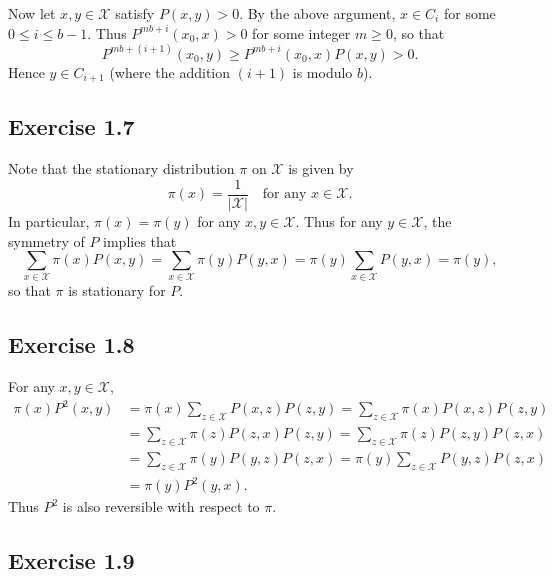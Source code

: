 \documentclass[12pt]{article}
\begin{document}
Now let $x, y \in \mathcal{X}$ satisfy $P(x, y) > 0$. By the above argument, $x \in C_i$ for some $0 \leq i \leq b - 1$. Thus $P^{mb+i}(x_0, x) > 0$ for some integer $m \geq 0$, so that
\begin{equation*}
P^{mb+(i+1)}(x_0, y) \geq P^{mb+i}(x_0, x) P(x, y) > 0.
\end{equation*}
Hence $y \in C_{i+1}$ (where the addition $(i+1)$ is modulo $b$).

\subsection*{Exercise 1.7}

Note that the stationary distribution $\pi$ on $\mathcal{X}$ is given by
\begin{equation*}
\pi(x) = \frac{1}{|\mathcal{X}|} \quad \text{for any $x \in \mathcal{X}$}.
\end{equation*}
In particular, $\pi(x) = \pi(y)$ for any $x, y \in \mathcal{X}$. Thus for any $y \in \mathcal{X}$, the symmetry of $P$ implies that
\begin{equation*}
\sum_{x \in \mathcal{X}} \pi(x) P(x, y) = \sum_{x \in \mathcal{X}} \pi(y) P(y, x) = \pi(y) \sum_{x \in \mathcal{X}} P(y, x) = \pi(y),
\end{equation*}
so that $\pi$ is stationary for $P$.

\subsection*{Exercise 1.8}

For any $x, y \in \mathcal{X}$,
\begin{align*}
\pi(x) P^2(x, y) &= \pi(x) \sum_{z \in \mathcal{X}} P(x, z) P(z, y) = \sum_{z \in \mathcal{X}} \pi(x) P(x, z) P(z, y) \\
&= \sum_{z \in \mathcal{X}} \pi(z) P(z, x) P(z, y) = \sum_{z \in \mathcal{X}} \pi(z) P(z, y) P(z, x) \\
&= \sum_{z \in \mathcal{X}} \pi(y) P(y, z) P(z, x) = \pi(y) \sum_{z \in \mathcal{X}} P(y, z) P(z, x) \\
&= \pi(y) P^2(y, x).
\end{align*}
Thus $P^2$ is also reversible with respect to $\pi$.

\subsection*{Exercise 1.9}
\end{document}
